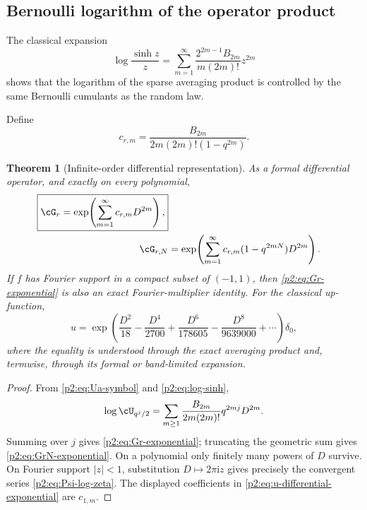 \documentclass[11pt,oneside]{article}
\newtheorem{theorem}{Theorem}[section]
\theoremstyle{definition}
\newcommand{\ii}{\mathrm i}
\begin{document}
\subsection{Bernoulli logarithm of the operator product}

The classical expansion
\begin{equation}
 \log\frac{\sinh z}{z}
 =\sum_{m=1}^{\infty}
   \frac{2^{2m-1}B_{2m}}{m(2m)!}z^{2m}                   \label{p2:eq:log-sinh}
\end{equation}
shows that the logarithm of the sparse averaging product is controlled by the
same Bernoulli cumulants as the random law.

Define
\begin{equation}
 c_{r,m}=\frac{B_{2m}}{2m(2m)!(1-q^{2m})}.                 \label{p2:eq:crm}
\end{equation}

\begin{theorem}[Infinite-order differential representation]
\label{p2:thm:infinite-differential-operator}
As a formal differential operator, and exactly on every polynomial,
\begin{align}
 \boxed{\displaystyle
 \cG_r
 =\exp\!\left(\sum_{m=1}^{\infty}c_{r,m}D^{2m}\right),}  \label{p2:eq:Gr-exponential}\\
 \cG_{r,N}
 &=\exp\!\left(\sum_{m=1}^{\infty}
       c_{r,m}(1-q^{2mN})D^{2m}\right).                   \label{p2:eq:GrN-exponential}
\end{align}
If $f$ has Fourier support in a compact subset of $(-1,1)$, then
\eqref{p2:eq:Gr-exponential} is also an exact Fourier-multiplier identity.
For the classical up-function,
\begin{equation}
 \boxed{\displaystyle
 u=\exp\!\left(
   \frac{D^2}{18}-\frac{D^4}{2700}+\frac{D^6}{178605}
   -\frac{D^8}{9639000}+\cdots\right)\delta_0,}           \label{p2:eq:u-differential-exponential}
\end{equation}
where the equality is understood through the exact averaging product and,
termwise, through its formal or band-limited expansion.
\end{theorem}

\begin{proof}
From \eqref{p2:eq:Ua-symbol} and \eqref{p2:eq:log-sinh},
\[
 \log\cU_{q^j/2}
 =\sum_{m\ge1}\frac{B_{2m}}{2m(2m)!}q^{2mj}D^{2m}.
\]
Summing over $j$ gives \eqref{p2:eq:Gr-exponential}; truncating the geometric sum
gives \eqref{p2:eq:GrN-exponential}.  On a polynomial only finitely many
powers of $D$ survive.  On Fourier support $|z|<1$, substitution
$D\mapsto2\pi\ii z$ gives precisely the convergent series
\eqref{p2:eq:Psi-log-zeta}.  The displayed coefficients in
\eqref{p2:eq:u-differential-exponential} are $c_{1,m}$.
\end{proof}
\end{document}
